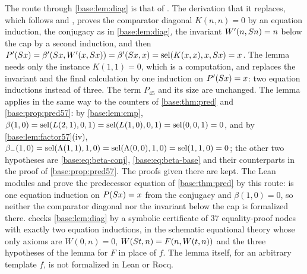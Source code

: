 \begin{remark}
\label{base:rem:diag}
The route through \cref{base:lem:diag} is that of .
The derivation that it replaces, which follows  and
, proves the comparator diagonal $K(n,n)=0$ by an
equation induction, the conjugacy as in \cref{base:lem:diag}, the invariant
$W'(n,S n)=n$ below the cap by a second induction, and then
$P'(S x)=\beta'(S x,W'(x,S x))=\beta'(S x,x)
 =\operatorname{sel}(K(x,x),x,S x)=x$.  The lemma needs only the instance
$K(1,1)=0$, which is a computation, and replaces the invariant and the final
calculation by one induction on $P'(S x)=x$: two equation inductions
instead of three.  The term $P_{45}$ and its size are unchanged.  The lemma
applies in the same way to the counters of \cref{base:thm:pred} and
\cref{base:prop:pred57}: by \cref{base:lem:cmp},
$\beta(1,0)=\operatorname{sel}(L(2,1),0,1)=\operatorname{sel}(L(1,0),0,1)=\operatorname{sel}(0,0,1)=0$, and by
\cref{base:lem:factor57}(iv),
$\beta_-(1,0)=\operatorname{sel}(\Lambda(1,1),1,0)=\operatorname{sel}(\Lambda(0,0),1,0)=\operatorname{sel}(1,1,0)=0$;
the other two hypotheses are \eqref{base:eq:beta-conj},
\eqref{base:eq:beta-base} and their counterparts in the proof of
\cref{base:prop:pred57}.  The proofs given there are kept.  The Lean
modules  and  prove the predecessor equation of
\cref{base:thm:pred} by this route:  is one equation
induction on $P(S x)=x$ from the conjugacy  and
$\beta(1,0)=0$, so neither the comparator diagonal nor the invariant below the
cap is formalized there.   checks
\cref{base:lem:diag} by a symbolic certificate of $37$ equality-proof nodes
with exactly two equation inductions, in the schematic equational theory
whose only axioms are $W(0,n)=0$, $W(S t,n)=F(n,W(t,n))$ and the three
hypotheses of the lemma for $F$ in place of $f$.  The lemma itself, for an
arbitrary template $f$, is not formalized in Lean or Rocq.
\end{remark}

